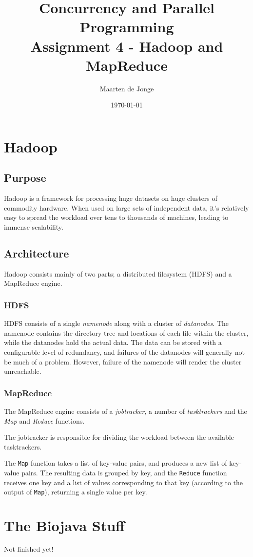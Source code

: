 \documentclass[a4paper]{article}
\author{Maarten de Jonge}
\date{\today}
\title{Concurrency and Parallel Programming \\
       \large{Assignment 4 - Hadoop and MapReduce}}
\begin{document}
\maketitle

\section*{Hadoop}

\subsection*{Purpose}
Hadoop is a framework for processing huge datasets on huge clusters of
commodity hardware. When used on large sets of independent data, it's relatively
easy to spread the workload over tens to thousands of machines, leading to
immense scalability.

\subsection*{Architecture}
Hadoop consists mainly of two parts; a distributed filesystem (HDFS) and a MapReduce
engine.

\subsubsection*{HDFS}
HDFS consists of a single \emph{namenode} along with a cluster of
\emph{datanodes}. The namenode contains the directory tree and locations of each
file within the cluster, while the datanodes hold the actual data. The data can
be stored with a configurable level of redundancy, and failures of the datanodes
will generally not be much of a problem. However, failure of the namenode will
render the cluster unreachable.

\subsubsection*{MapReduce}
The MapReduce engine consists of a \emph{jobtracker}, a number of
\emph{tasktrackers} and the \emph{Map} and \emph{Reduce} functions.

The jobtracker is responsible for dividing the workload between the available
tasktrackers.

The \texttt{Map} function takes a list of key-value pairs, and produces a new
list of key-value pairs. The resulting data is grouped by key, and the
\texttt{Reduce} function receives one key and a list of values corresponding to
that key (according to the output of \texttt{Map}), returning a single value per
key.

\section*{The Biojava Stuff}
Not finished yet!
\end{document}
